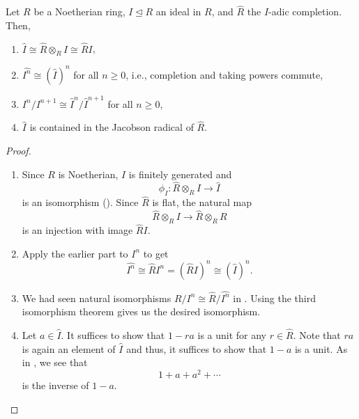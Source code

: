 \begin{prop} \label{prop:I-adic-completion-properties}
	Let $R$ be a Noetherian ring, $I \unlhd R$ an ideal in $R$, and $\widehat{R}$ the $I$-adic completion. Then,
	\begin{enumerate}
		\item $\widehat{I} \cong \widehat{R} \otimes_{R} I \cong \widehat{R} I$,
		\item $\widehat{I^{n}} \cong (\widehat{I})^{n}$ for all $n \ge 0$, i.e., completion and taking powers commute,
		\item $I^{n}/I^{n + 1} \cong \widehat{I}^{n}/\widehat{I}^{n + 1}$ for all $n \ge 0$,
		\item $\widehat{I}$ is contained in the Jacobson radical of $\widehat{R}$.
	\end{enumerate}
\end{prop}
\begin{proof} 
	\phantom{hi}
	\begin{enumerate}
		\item Since $R$ is Noetherian, $I$ is finitely generated and 
		\begin{equation*} 
			\phi_{I} : \widehat{R} \otimes_{R} I \to \widehat{I}
		\end{equation*}
		is an isomorphism (). Since $\widehat{R}$ is flat, the natural map
		\begin{equation*} 
			\widehat{R} \otimes_{R} I \to \widehat{R} \otimes_{R} R
		\end{equation*}
		is an injection with image $\widehat{R} I$.
		\item Apply the earlier part to $I^{n}$ to get
		\begin{equation*} 
			\widehat{I^{n}} \cong \widehat{R} I^{n} = (\widehat{R} I)^{n} \cong (\widehat{I})^{n}.
		\end{equation*}
		\item We had seen natural isomorphisms $R/I^{n} \cong \widehat{R}/\widehat{I^{n}}$ in . Using the third isomorphism theorem gives us the desired isomorphism.
		\item Let $a \in \widehat{I}$. It suffices to show that $1 - ra$ is a unit for any $r \in \widehat{R}$. Note that $ra$ is again an element of $\widehat{I}$ and thus, it suffices to show that $1 - a$ is a unit. As in , we see that
		\begin{equation*} 
			1 + a + a^{2} + \cdots
		\end{equation*}
		is the inverse of $1 - a$. \qedhere
	\end{enumerate}
\end{proof}

